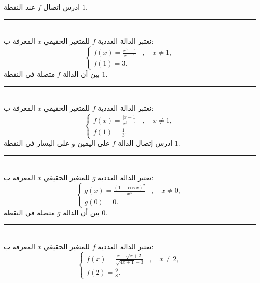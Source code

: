 \documentclass[10pt,a4paper,twocolumn]{arabart}
\begin{document}
ادرس اتصال $f$  عند النقطة $1$.
\\
 \hrule
 \\
    نعتبر الدالة العددية $f$ للمتغير الحقيقي $x$ المعرفة ب:\\
    \begin{displaymath}
 \left\{
    \begin{array}{ll}
       f(x)=\displaystyle\frac{x^3-1}{x-1}    &, \quad x \neq 1,\\
      f(1)=3.   &
    \end{array}
\right.
\end{displaymath}
بين أن الدالة $f$ متصلة في النقطة $1$.
\\
 \hrule
 \\
        نعتبر الدالة العددية $f$ للمتغير الحقيقي $x$ المعرفة ب:\\
    \begin{displaymath}
 \left\{
    \begin{array}{ll}
       f(x)=\displaystyle\frac{|x-1|}{x^3-1}    &, \quad x \neq 1,\\
      f(1)=\frac{1}{3}.   &
    \end{array}
\right.
\end{displaymath}
ادرس إتصال  الدالة $f$ على اليمين و على اليسار في النقطة $1$.
\\
  \hrule
 \\
        نعتبر الدالة العددية $g$ للمتغير الحقيقي $x$ المعرفة ب:\\
    \begin{displaymath}
 \left\{
    \begin{array}{ll}
       g(x)=\displaystyle\frac{(1-\cos{x})^2}{x^3}    &, \quad x \neq 0,\\
      g(0)=0.   &
    \end{array}
\right.
\end{displaymath}
بين أن   الدالة $g$ متصلة  في النقطة $0$.
\\
 \hrule
 \\
        نعتبر الدالة العددية $f$ للمتغير الحقيقي $x$ المعرفة ب:\\
    \begin{displaymath}
 \left\{
    \begin{array}{ll}
       f(x)=\displaystyle\frac{x-\sqrt{x+2}}{\sqrt{4x+1}-3}    &, \quad x \neq 2,\\
      f(2)=\displaystyle\frac{9}{8}.   &
    \end{array}
\right.
\end{displaymath}
\end{document}
